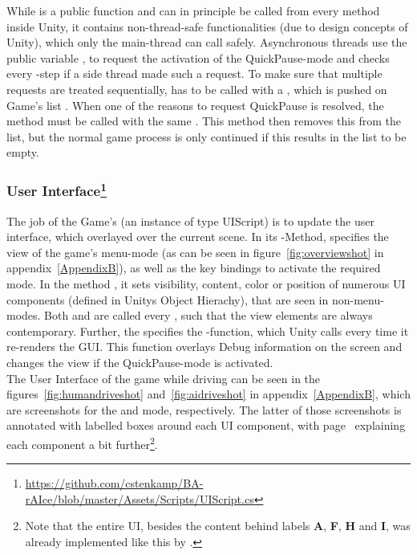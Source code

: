 While  is a public function and can in principle be called from every method inside Unity, it contains non-thread-safe functionalities (due to design concepts of Unity), which only the main-thread can call safely. Asynchronous threads use the public variable , to request the activation of the QuickPause-mode and  checks every -step if a side thread made such a request. To make sure that multiple requests are treated sequentially,  has to be called with a , which is pushed on Game's list . When one of the reasons to request QuickPause is resolved, the method  must be called with the same . This method then removes this  from the list, but the normal game process is only continued if this results in the list to be empty. 

\subsubsection{User Interface\footnote{\url{https://github.com/cstenkamp/BA-rAIce/blob/master/Assets/Scripts/UIScript.cs}}}

The job of the Game's  (an instance of type UIScript) is to update the user interface, which overlayed over the current scene. In its -Method,  specifies the view of the game's menu-mode (as can be seen in figure~\ref{fig:overviewshot} in appendix~\ref{AppendixB}), as well as the key bindings to activate the required mode. In the method , it sets visibility, content, color or position of numerous UI components (defined in Unitys Object Hierachy), that are seen in non-menu-modes. Both  and  are called every , such that the view elements are always contemporary. Further, the  specifies the -function, which Unity calls every time it re-renders the GUI. This function overlays Debug information on the screen and changes the view if the QuickPause-mode is activated.\\

\noindent The User Interface of the game while driving can be seen in the figures~\ref{fig:humandriveshot} and~\ref{fig:aidriveshot} in appendix~\ref{AppendixB}, which are screenshots for the  and  mode, respectively. The latter of those screenshots is annotated with labelled boxes around each UI component, with page~\pageref{fig:aidriveshot} explaining each component a bit further\footnote{Note that the entire UI, besides the content behind labels \textbf{A}, \textbf{F}, \textbf{H} and \textbf{I}, was already implemented like this by \leon.}.

